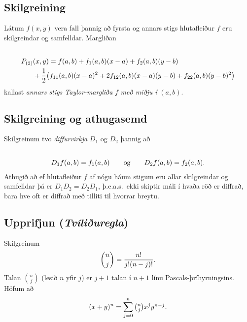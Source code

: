 \documentclass[a4paper,10pt,icelandic]{sphinxmanual}
\begin{document}
\subsection{Skilgreining}
\label{Kafli2:id57}
Látum \(f(x,y)\) vera fall þannig að fyrsta og annars stigs
hlutafleiður \(f\) eru skilgreindar og samfelldar. Margliðan
\begin{gather}
\begin{split}\displaystyle\end{split}\notag\\\begin{split}\begin{aligned}
P_{(2)}&(x,y)=f(a,b)+f_1(a,b)(x-a)+f_2(a,b)(y-b)\\
&+\frac{1}{2}\big(f_{11}(a,b)(x-a)^2+
2f_{12}(a,b)(x-a)(y-b)+f_{22}(a,b)(y-b)^2\big)\end{aligned}\end{split}\notag
\end{gather}
kallast \emph{annars stigs Taylor-margliða} \(f\) \emph{með miðju í}
\((a,b)\).


\subsection{Skilgreining og athugasemd}
\label{Kafli2:skilgreining-og-athugasemd}
Skilgreinum tvo \textit{diffurvirkja} \(D_1\) og \(D_2\) þannig að
\begin{gather}
\begin{split}\displaystyle\end{split}\notag\\\begin{split}D_1f(a,b)=f_1(a,b)\qquad\mbox{og}\qquad
D_2f(a,b)=f_2(a,b).\end{split}\notag
\end{gather}
Athugið að ef hlutafleiður \(f\) af nógu háum stigum eru allar
skilgreindar og samfelldar þá er \(D_1D_2=D_2D_1\), þ.e.a.s. ekki
skiptir máli í hvaða röð er diffrað, bara hve oft er diffrað með tilliti
til hvorrar breytu.


\subsection{Upprifjun (\textit{Tvíliðuregla})}
\label{Kafli2:index-32}\label{Kafli2:id58}
Skilgreinum
\begin{gather}
\begin{split}\displaystyle {n\choose j}=\frac{n!}{j!(n-j)!}.\end{split}\notag
\end{gather}
Talan \({n\choose j}\) (lesið \(n\) yfir \(j\)) er
\(j+1\) talan í \(n+1\) línu Pascals-þríhyrningsins. Höfum að
\begin{gather}
\begin{split}\displaystyle (x+y)^n=\sum_{j=0}^n \textstyle{n\choose j}x^jy^{n-j}.\end{split}\notag
\end{gather}
\end{document}
